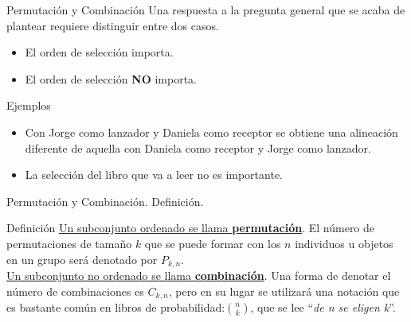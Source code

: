 \documentclass[11pt]{beamer}
\begin{document}
          \begin{frame}{Permutación y Combinación}
              Una respuesta a la pregunta general que se acaba de plantear requiere distinguir entre
dos casos.
              \begin{itemize}
                  \item El orden de selección importa.
                  \item El orden de selección \textbf{NO} importa.
              \end{itemize}

              \pause
              \begin{block}{Ejemplos}
                  \begin{itemize}
                      \item Con Jorge como lanzador y Daniela como receptor se obtiene una
alineación diferente de aquella con Daniela como receptor y Jorge como lanzador.
                      \item La selección del libro que va a leer no es importante.
                  \end{itemize}
              \end{block}

          \end{frame}

         \begin{frame}{Permutación y Combinación. Definición.}
           \begin{block}{Definici\'on}
               \underline{Un subconjunto ordenado se llama \textbf{permutación}}. El número de permutaciones de tamaño $k$ que se puede formar con los $n$ individuos u objetos en un grupo será denotado por $P_{k,n}$.\\
               \pause
               \underline{Un subconjunto no ordenado se llama \textbf{combinación}}. Una forma de denotar el
número de combinaciones es $C_ {k,n}$, pero en su lugar se utilizará una notación que es bastante común en libros de probabilidad:$\binom{n}{k}$, que se lee “\textit{de n se eligen k}”.
           \end{block}
         \end{frame}
\end{document}
